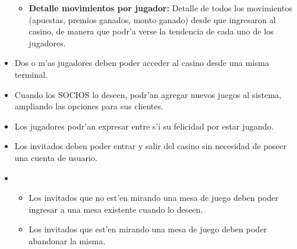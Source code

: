 \begin{itemize}
\begin{itemize}
        \item {\bf Detalle movimientos por jugador:} Detalle de todos los movimientos (apuestas, premios ganados, monto ganado) desde que ingresaron al casino, de manera que podr'a verse la tendencia de cada uno de los jugadores.
    \end{itemize}

\item {} 

    Dos o m'as jugadores deben poder acceder al casino desde una misma terminal.

\item {} 

    Cuando los SOCIOS lo deseen, podr'an agregar nuevos juegos al sistema, ampliando las opciones para sus clientes.

\end{itemize}



\begin{itemize}

\item {} 

    Los jugadores podr'an expresar entre s'i su felicidad por estar jugando.

\item {} 

    Los invitados deben poder entrar y salir del casino sin necesidad de poseer una cuenta de usuario.

\item {}

    \begin{itemize}
        \item Los invitados que no est'en mirando una mesa de juego deben poder ingresar a una mesa existente cuando lo deseen.
        \item Los invitados que est'en mirando una mesa de juego deben poder abandonar la misma.
    \end{itemize}

\end{itemize}


